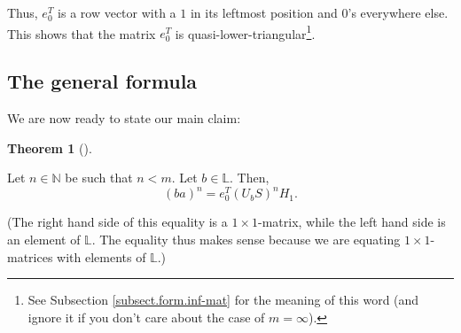 \documentclass[numbers=enddot,12pt,final,onecolumn,notitlepage]{scrartcl}%
\theoremstyle{definition}
\newtheorem{theo}{Theorem}[section]
\newenvironment{theorem}[1][]
{\begin{theo}[#1]\begin{leftbar}}
{\end{leftbar}\end{theo}}
\begin{document}
Thus, $e_{0}^{T}$ is a row vector with a $1$ in its leftmost position and
$0$'s everywhere else. This shows that the matrix $e_{0}^{T}$ is
quasi-lower-triangular\footnote{See Subsection \ref{subsect.form.inf-mat} for
the meaning of this word (and ignore it if you don't care about the case of
$m=\infty$).}.

\subsection{\label{subsect.form.thm}The general formula}

We are now ready to state our main claim:


\begin{theorem}
\label{thm.gen}Let $n\in\mathbb{N}$ be such that $n<m$. Let $b\in\mathbb{L}$.
Then,%
\[
\left(  ba\right)  ^{n}=e_{0}^{T}\left(  U_{b}S\right)  ^{n}H_{1}.
\]

\end{theorem}


(The right hand side of this equality is a $1\times1$-matrix, while the left
hand side is an element of $\mathbb{L}$. The equality thus makes sense because
we are equating $1\times1$-matrices with elements of $\mathbb{L}$.)
\end{document}
